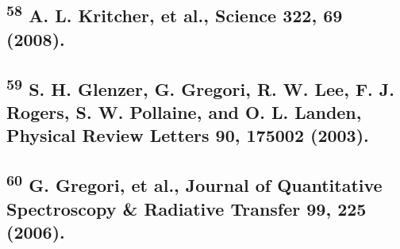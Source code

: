 \subsection{\texorpdfstring{\textsuperscript{58} A. L. Kritcher, et al.,
Science 322, 69
(2008).}{58 A. L. Kritcher, et al., Science 322, 69 (2008).}}\label{a.-l.-kritcher-et-al.-science-322-69-2008.}

\subsection{\texorpdfstring{\textsuperscript{59} S. H. Glenzer, G.
Gregori, R. W. Lee, F. J. Rogers, S. W. Pollaine, and O. L. Landen,
Physical Review Letters 90, 175002
(2003).}{59 S. H. Glenzer, G. Gregori, R. W. Lee, F. J. Rogers, S. W. Pollaine, and O. L. Landen, Physical Review Letters 90, 175002 (2003).}}\label{s.-h.-glenzer-g.-gregori-r.-w.-lee-f.-j.-rogers-s.-w.-pollaine-and-o.-l.-landen-physical-review-letters-90-175002-2003.}

\subsection{\texorpdfstring{\textsuperscript{60} G. Gregori, et al.,
Journal of Quantitative Spectroscopy \& Radiative Transfer 99, 225
(2006).}{60 G. Gregori, et al., Journal of Quantitative Spectroscopy \& Radiative Transfer 99, 225 (2006).}}\label{g.-gregori-et-al.-journal-of-quantitative-spectroscopy-radiative-transfer-99-225-2006.}


\subsection{}\label{section}


